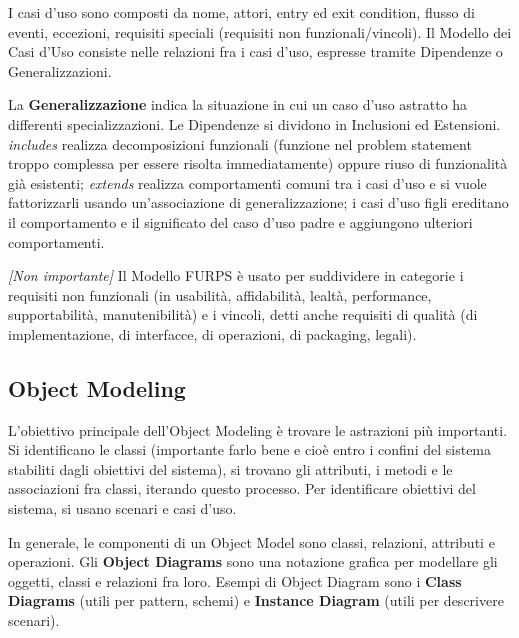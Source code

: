 \documentclass{article}
\begin{document}
        I casi d’uso sono composti da nome, attori, entry ed exit condition, flusso di eventi, eccezioni, requisiti speciali (requisiti non funzionali/vincoli). Il Modello dei Casi d’Uso consiste nelle relazioni fra i casi d’uso, espresse tramite Dipendenze o Generalizzazioni. 
        
        \vspace{3mm}
        
        La \textbf{Generalizzazione} indica la situazione in cui un caso d’uso astratto ha differenti specializzazioni. Le Dipendenze si dividono in Inclusioni ed Estensioni. \textit{includes} realizza decomposizioni funzionali (funzione nel problem statement troppo complessa per essere risolta immediatamente) oppure riuso di funzionalità già esistenti; \textit{extends} realizza comportamenti comuni tra i casi d’uso e si vuole fattorizzarli usando un’associazione di generalizzazione; i casi d’uso figli ereditano il comportamento e il significato del caso d’uso padre e aggiungono ulteriori comportamenti.
        
        \vspace{3mm}
        
        \textit{[Non importante]} Il Modello FURPS è usato per suddividere in categorie i requisiti non funzionali (in usabilità, affidabilità, lealtà, performance, supportabilità, manutenibilità) e i vincoli, detti anche requisiti di qualità (di implementazione, di interfacce, di operazioni, di packaging, legali). 
    
    \subsection{Object Modeling}
    
        L'obiettivo principale dell’Object Modeling è trovare le astrazioni più importanti. Si identificano le classi (importante farlo bene e cioè entro i confini del sistema stabiliti dagli obiettivi del sistema), si trovano gli attributi, i metodi e le associazioni fra classi, iterando questo processo. Per identificare obiettivi del sistema, si usano scenari e casi d’uso. 
        
        \vspace{3mm}
        
        In generale, le componenti di un Object Model sono classi, relazioni, attributi e operazioni. Gli \textbf{Object Diagrams} sono una notazione grafica per modellare gli oggetti, classi e relazioni fra loro. Esempi di Object Diagram sono i \textbf{Class Diagrams} (utili per pattern, schemi) e \textbf{Instance Diagram} (utili per descrivere scenari). 
        
\end{document}

